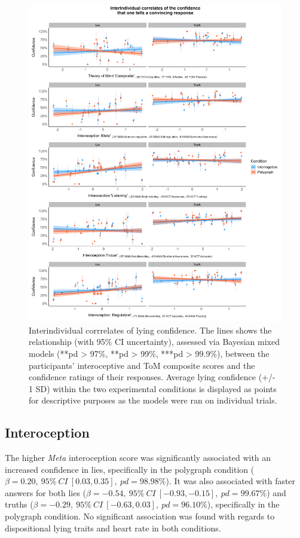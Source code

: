 \documentclass[
  man,mask,floatsintext]{apa6}
\begin{document}
\begin{figure}
\includegraphics[width=1\linewidth]{../figures/figure1} \caption{Interindividual corrrelates of lying confidence. The lines shows the relationship (with 95\% CI uncertainty), assessed via Bayesian mixed models (\***pd > 97\%, \***pd > 99\%, \****pd > 99.9\%), between the participants' interoceptive and ToM composite scores and the confidence ratings of their responses. Average lying confidence (+/- 1 SD) within the two experimental conditions is displayed as points for descriptive purposes as the models were ran on individual trials.}\label{fig:unnamed-chunk-1}
\end{figure}

\subsection{Interoception}\label{interoception-1}

The higher \emph{Meta} interoception score was significantly associated with an increased confidence in lies, specifically in the polygraph condition (\(\beta=0.20,~95\%~CI~[0.03, 0.35],~pd = 98.98\%\)). It was also associated with faster answers for both lies (\(\beta=-0.54,~95\%~CI~[-0.93, -0.15],~pd = 99.67\%\)) and truths (\(\beta=-0.29,~95\%~CI~[-0.63, 0.03],~pd = 96.10\%\)), specifically in the polygraph condition. No significant association was found with regards to dispositional lying traits and heart rate in both conditions.
\end{document}
